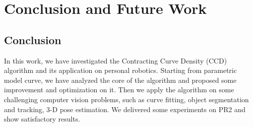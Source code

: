 
\chapter{Conclusion and  Future Work}
\label{chapter:conclusion}

\section{Conclusion}
\label{sec:con}

In this work, we have investigated the Contracting Curve Density (CCD)
algorithm and its application on personal robotics. Starting from
parametric model curve, we have analyzed the core of the algorithm and
proposed some improvement and optimization on it. Then we apply the
algorithm on some challenging computer vision problems, such as curve
fitting, object segmentation and tracking, 3-D pose estimation.  We
delivered some experiments on PR2 and show satisfactory results. 

